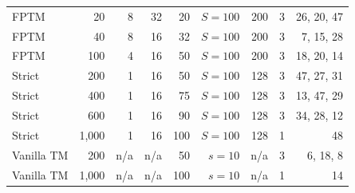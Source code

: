 \begin{tabular}{lrrrrrrrr}
FPTM & 20 & 8 & 32 & 20 & $S=100$ & 200 & 3 & 26, 20, 47 \\
FPTM & 40 & 8 & 16 & 32 & $S=100$ & 200 & 3 & 7, 15, 28 \\
FPTM & 100 & 4 & 16 & 50 & $S=100$ & 200 & 3 & 18, 20, 14 \\
Strict & 200 & 1 & 16 & 50 & $S=100$ & 128 & 3 & 47, 27, 31 \\
Strict & 400 & 1 & 16 & 75 & $S=100$ & 128 & 3 & 13, 47, 29 \\
Strict & 600 & 1 & 16 & 90 & $S=100$ & 128 & 3 & 34, 28, 12 \\
Strict & 1,000 & 1 & 16 & 100 & $S=100$ & 128 & 1 & 48 \\
Vanilla TM & 200 & n/a & n/a & 50 & $s=10$ & n/a & 3 & 6, 18, 8 \\
Vanilla TM & 1,000 & n/a & n/a & 100 & $s=10$ & n/a & 1 & 14 \\
\bottomrule
\end{tabular}
